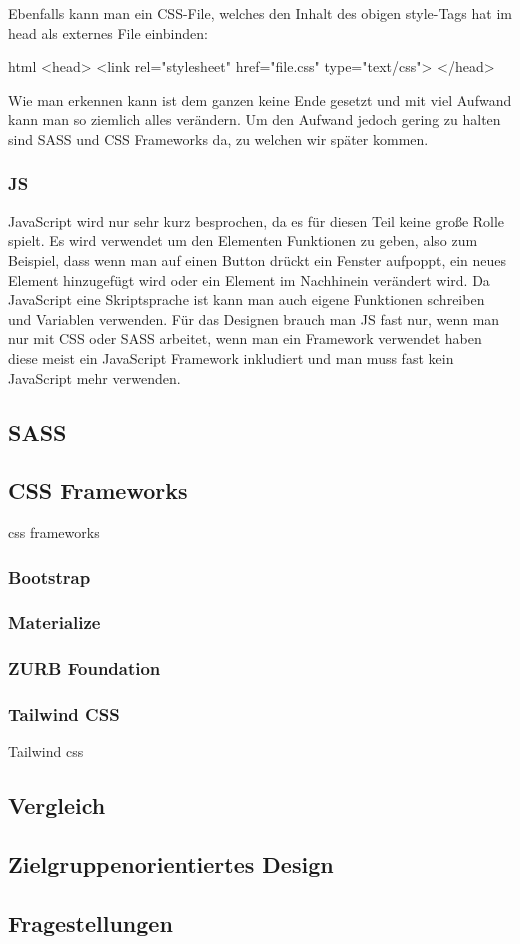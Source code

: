 		Ebenfalls kann man ein CSS-File, welches den Inhalt des obigen style-Tags hat im head als externes File einbinden:
		\begin{code}{html}
			<head>
				<link rel="stylesheet" href="file.css" type="text/css">
			</head>
		\end{code}
		Wie man erkennen kann ist dem ganzen keine Ende gesetzt und mit viel Aufwand kann man so ziemlich alles verändern. Um den Aufwand jedoch gering zu halten sind SASS und CSS Frameworks da, zu welchen wir später kommen.
		\cite{html5-css3-def}
		\cite{html5-css3-handbuch}
		\subsubsection{JS}
		JavaScript wird nur sehr kurz besprochen, da es für diesen Teil keine große Rolle spielt. Es wird verwendet um den Elementen Funktionen zu geben, also zum Beispiel, dass wenn man auf einen Button drückt ein Fenster aufpoppt, ein neues Element hinzugefügt wird oder ein Element im Nachhinein verändert wird. Da JavaScript eine Skriptsprache ist kann man auch eigene Funktionen schreiben und Variablen verwenden. Für das Designen brauch man JS fast nur, wenn man nur mit CSS oder SASS arbeitet, wenn man ein Framework verwendet haben diese meist ein JavaScript Framework inkludiert und man muss fast kein JavaScript mehr verwenden.
	\subsection{SASS}
	\subsection{CSS Frameworks}
	\Gls{css} \Gls{framework}s
		\subsubsection{Bootstrap}
		\subsubsection{Materialize}
		\subsubsection{ZURB Foundation}
		\subsubsection{Tailwind CSS}
		Tailwind \Gls{css}
	
	\subsection{Vergleich}
	
	\subsection{Zielgruppenorientiertes Design}
	\subsection{Fragestellungen}
